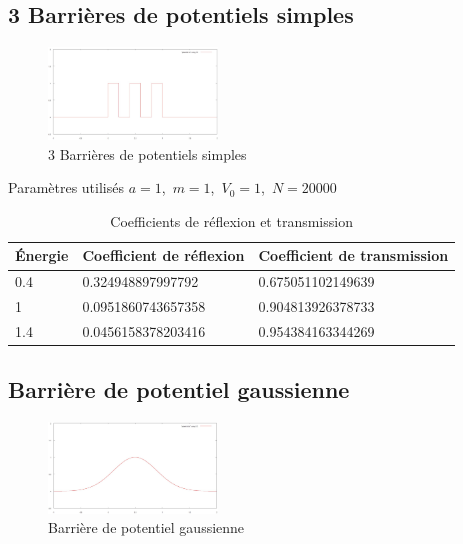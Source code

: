 \subsection{ 3 Barrières de potentiels simples}
\begin{center}

\end{center}
\begin{figure}[!ht]
    \center
    \includegraphics[width=0.4\textwidth]{potentiel3barriere.jpg}
    \caption{ 3 Barrières de potentiels simples}
    \label{potentiel3barriere}
\end{figure}

\begin{table}[!ht]
\centering
Paramètres utilisés  $a=1$,\ $m=1$,\ $V_{0}=1$,\ $N=20000$\\
\begin{tabular}{|l|l|l|}
\hline  Énergie & Coefficient de réflexion  & Coefficient de transmission \\
\hline  0.4 &   0.324948897997792 &  0.675051102149639\\
\hline 1 & 0.0951860743657358 & 0.904813926378733\\ 
\hline 1.4 &0.0456158378203416 & 0.954384163344269\\
\hline
\end{tabular}
\caption{Coefficients de réflexion et transmission}
\label{tab6}
\end{table}

\subsection{Barrière de potentiel gaussienne}
\begin{center}

\end{center}
\begin{figure}[!ht]
    \center
    \includegraphics[width=0.4\textwidth]{barrieregaussienne.jpg}
    \caption{ Barrière de potentiel gaussienne}
    \label{barrieregaussiennne}
\end{figure}

